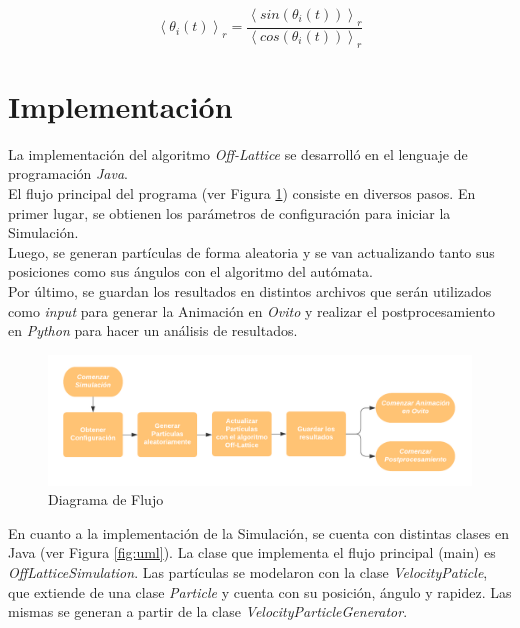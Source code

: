 \documentclass[12pt, a4paper]{report}
\begin{document}
\begin{equation}
\label{eq:avgangle}
\left\langle \theta _i(t)\right\rangle _r =  \frac{\left\langle sin(\theta _i(t))\right\rangle _r}{\left\langle cos(\theta _i(t))\right\rangle _r} 
\end{equation}

\section{Implementación}
La implementación del algoritmo \emph{Off-Lattice} se desarrolló en el lenguaje de programación \emph{Java}.\\

El flujo principal del programa (ver Figura \ref{fig:diagrama_flujo}) consiste en diversos pasos. En primer lugar, se obtienen los parámetros de configuración para iniciar la Simulación.\\

Luego, se generan partículas de forma aleatoria y se van actualizando tanto sus posiciones como sus ángulos con el algoritmo del autómata. \\

Por último, se guardan los resultados en distintos archivos que serán utilizados como \emph{input} para generar la Animación en \emph{Ovito} y realizar el postprocesamiento en \emph{Python} para hacer un análisis de resultados.\\

\begin{figure}[h]
\includegraphics[scale=0.35]{Diagrama de flujo.png}
\centering 
\caption{Diagrama de Flujo}
\label{fig:diagrama_flujo}
\end{figure}

 
En cuanto a la implementación de la Simulación, se cuenta con distintas clases en Java (ver Figura \ref{fig:uml}). La clase que implementa el flujo principal (main) es \emph{OffLatticeSimulation}. Las partículas se modelaron con la clase \emph{VelocityPaticle}, que extiende de una clase \emph{Particle} y cuenta con su posición, ángulo y rapidez. Las mismas se generan a partir de la clase \emph{VelocityParticleGenerator}.\\
\end{document}
